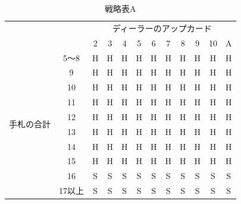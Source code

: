 \begin{table}[H]
    \caption{戦略表A}
    \begin{center}
        \begin{tabular}{|c|c|c|c|c|c|c|c|c|c|c|c|}
        \hline
        \multicolumn{2}{|c|}{\multirow{2}{*}{}} & \multicolumn{10}{c|}{ディーラーのアップカード}     \\ \cline{3-12} 
        \multicolumn{2}{|c|}{}                  & 2 & 3 & 4 & 5 & 6 & 7 & 8 & 9 & 10 & A \\ \hline
        \multirow{10}{*}{手札の合計}      & 5〜8      & H & H & H & H & H & H & H & H & H  & H \\ \cline{2-12} 
                                    & 9        & H & H & H & H & H & H & H & H & H  & H \\ \cline{2-12} 
                                    & 10       & H & H & H & H & H & H & H & H & H  & H \\ \cline{2-12} 
                                    & 11       & H & H & H & H & H & H & H & H & H  & H \\ \cline{2-12} 
                                    & 12       & H & H & H & H & H & H & H & H & H  & H \\ \cline{2-12} 
                                    & 13       & H & H & H & H & H & H & H & H & H  & H \\ \cline{2-12} 
                                    & 14       & H & H & H & H & H & H & H & H & H  & H \\ \cline{2-12} 
                                    & 15       & H & H & H & H & H & H & H & H & H  & H \\ \cline{2-12} 
                                    & 16       & S & S & S & S & S & S & S & S & S  & S \\ \cline{2-12} 
                                    & 17以上     & S & S & S & S & S & S & S & S & S  & S \\ \hline
        \end{tabular}
    \end{center}
\end{table}

